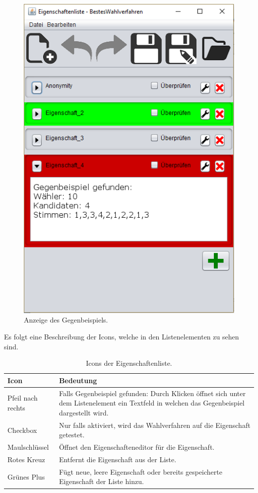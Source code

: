 \documentclass[a4paper]{scrreprt}
\begin{document}
\begin{figure}[H]
\begin{minipage}{.5\textwidth}
  \centering
  \includegraphics[scale=0.5]{gegenbeispiel.png}
  \caption{Anzeige des Gegenbeispiels.}
  \label{fig:sub2}
\end{minipage}
\end{figure}

Es folgt eine Beschreibung der Icons, welche in den Listenelementen zu sehen sind.

\begin{table}[H]
\begin{tabular}{|p{3cm}|p{12cm}|}
Icon & Bedeutung \\
\hline
Pfeil nach rechts & Falls Gegenbeispiel gefunden: Durch Klicken öffnet sich unter dem Listenelement ein Textfeld in welchen das Gegenbeispiel dargestellt wird. \\
\hline
Checkbox & Nur falls aktiviert, wird das Wahlverfahren auf die Eigenschaft getestet. \\
\hline
Maulschlüssel & Öffnet den Eigenschafteneditor für die Eigenschaft.\\
\hline
Rotes Kreuz & Entfernt die Eigenschaft aus der Liste. \\
\hline
Grünes Plus & Fügt neue, leere Eigenschaft oder bereits gespeicherte Eigenschaft der Liste hinzu.
\end{tabular}
\label{Eigenschaftenliste-Bearbeiten-Menüpunkte}
\caption{Icons der Eigenschaftenliste.}
\end{table}
\end{document}
